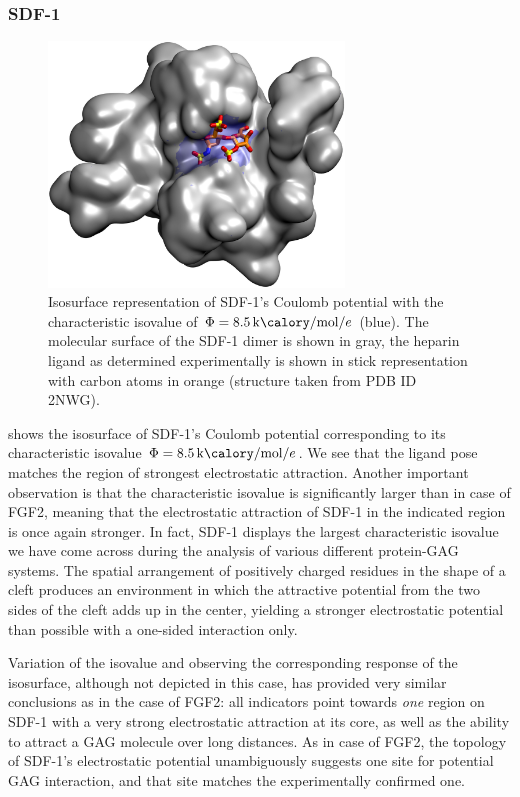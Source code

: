 \subsubsection{SDF-1}

\begin{figure}
\centering
\includegraphics[width=0.7\textwidth]{gfx/bspred/sdf1_isopot_8_5_view1_rotated_jcc_pub_001.jpg}
\caption[]{
Isosurface representation of SDF-1's Coulomb potential with the characteristic
isovalue of $\Phi=\SI{8.5}{\kilo\calory\per\mole\per\elementarycharge}$ (blue).
The molecular surface of the SDF-1 dimer is shown in gray, the heparin ligand as
determined experimentally is shown in stick representation with carbon atoms in
orange (structure taken from PDB ID 2NWG).}
\label{fig:bspred:sdf1_estatic}
\end{figure}

 shows the isosurface of SDF-1's Coulomb potential
corresponding to its characteristic isovalue
$\Phi=\SI{8.5}{\kilo\calory\per\mole\per\elementarycharge}$. We see that the
ligand pose matches the region of strongest electrostatic attraction. Another
important observation is that the characteristic isovalue is significantly
larger than in case of FGF2, meaning that the electrostatic attraction of SDF-1
in the indicated region is once again stronger. In fact, SDF-1 displays the
largest characteristic isovalue we have come across during the analysis of
various different protein-GAG systems. The spatial arrangement of positively
charged residues in the shape of a cleft produces an environment in which the
attractive potential from the two sides of the cleft adds up in the center,
yielding a stronger electrostatic potential than possible with a one-sided
interaction only.

Variation of the isovalue and observing the corresponding response of the
isosurface, although not depicted in this case, has provided very similar
conclusions as in the case of FGF2: all indicators point towards \textit{one}
region on SDF-1 with a very strong electrostatic attraction at its core, as well
as the ability to attract a GAG molecule over long distances. As in case of
FGF2, the topology of SDF-1's electrostatic potential unambiguously suggests one
site for potential GAG interaction, and that site matches the experimentally
confirmed one.


